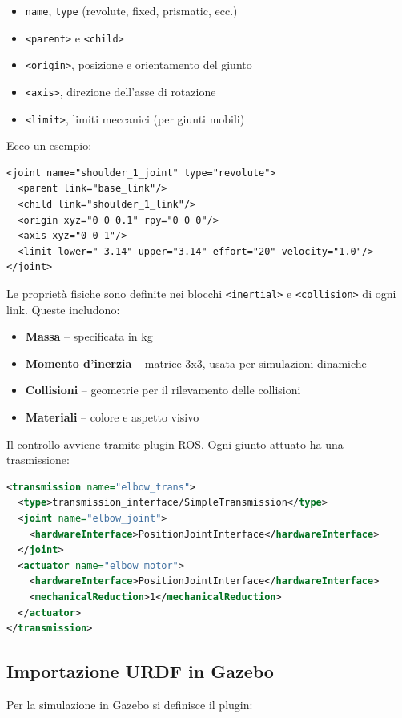 \documentclass[11pt]{report}
\begin{document}
\begin{itemize}
    \item \texttt{name}, \texttt{type} (revolute, fixed, prismatic, ecc.)
    \item \texttt{<parent>} e \texttt{<child>}
    \item \texttt{<origin>}, posizione e orientamento del giunto
    \item \texttt{<axis>}, direzione dell’asse di rotazione
    \item \texttt{<limit>}, limiti meccanici (per giunti mobili)
\end{itemize}

Ecco un esempio:

\begin{verbatim}
<joint name="shoulder_1_joint" type="revolute">
  <parent link="base_link"/>
  <child link="shoulder_1_link"/>
  <origin xyz="0 0 0.1" rpy="0 0 0"/>
  <axis xyz="0 0 1"/>
  <limit lower="-3.14" upper="3.14" effort="20" velocity="1.0"/>
</joint>
\end{verbatim}
\vspace{1em}
Le proprietà fisiche sono definite nei blocchi \texttt{<inertial>} e \texttt{<collision>} di ogni link. Queste includono:

\begin{itemize}
    \item \textbf{Massa} – specificata in kg
    \item \textbf{Momento d’inerzia} – matrice 3x3, usata per simulazioni dinamiche
    \item \textbf{Collisioni} – geometrie per il rilevamento delle collisioni
    \item \textbf{Materiali} – colore e aspetto visivo
\end{itemize}
\vspace{1em}
Il controllo avviene tramite plugin ROS. Ogni giunto attuato ha una trasmissione:

\begin{lstlisting}[language=xml]
<transmission name="elbow_trans">
  <type>transmission_interface/SimpleTransmission</type>
  <joint name="elbow_joint">
    <hardwareInterface>PositionJointInterface</hardwareInterface>
  </joint>
  <actuator name="elbow_motor">
    <hardwareInterface>PositionJointInterface</hardwareInterface>
    <mechanicalReduction>1</mechanicalReduction>
  </actuator>
</transmission>
\end{lstlisting}
\vspace{1em}

\subsection{Importazione URDF in Gazebo}
Per la simulazione in Gazebo si definisce il plugin:
\end{document}
